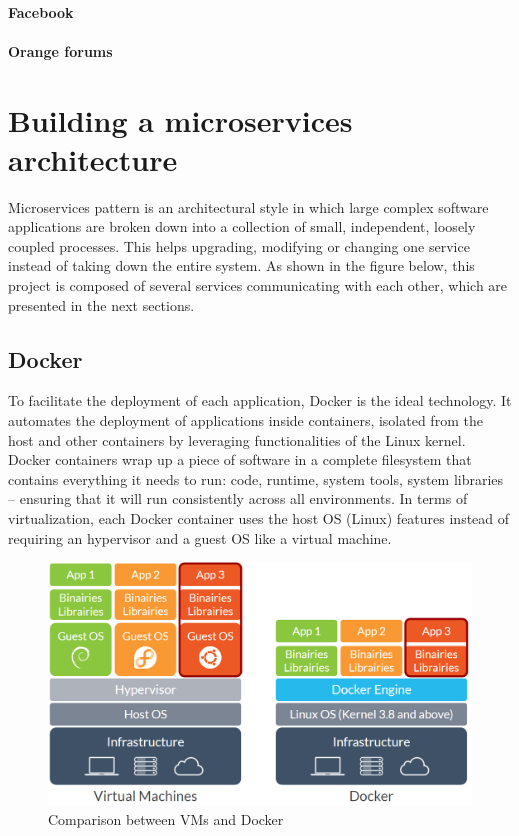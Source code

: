 \documentclass[11pt]{article}
\begin{document}
\paragraph{Facebook}

\paragraph{Orange forums}


\section{Building a microservices architecture}


Microservices pattern is an architectural style in which large complex software applications are broken down into a collection of small, independent, loosely coupled processes. This helps upgrading, modifying or changing one service instead of taking down the entire system. As shown in the figure below, this project is composed of several services communicating with each other, which are presented in the next sections.

\subsection{Docker}

To facilitate the deployment of each application, Docker is the ideal technology. It automates the deployment of applications inside containers, isolated from the host and other containers by leveraging functionalities of the Linux kernel. Docker containers wrap up a piece of software in a complete filesystem that contains everything it needs to run: code, runtime, system tools, system libraries – ensuring that it will run consistently across all environments. In terms of virtualization, each Docker container uses the host OS (Linux) features instead of requiring an hypervisor and a guest OS like a virtual machine.

\begin{figure}[h!]
    \centering
    \includegraphics[scale=0.4]{img/docker-vs-vm.png}
    \caption{Comparison between VMs and Docker}
    \label{docker-vs-vm}
\end{figure}
\end{document}
